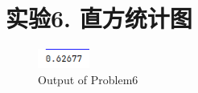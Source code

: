 \newpage
\section{实验6. 直方统计图}

\begin{figure}[H]
    \centering
    \includegraphics[width = 0.15\textwidth]{../pic/6/6.1.png}   
    \caption{Output of Problem6} 
\end{figure}
    
